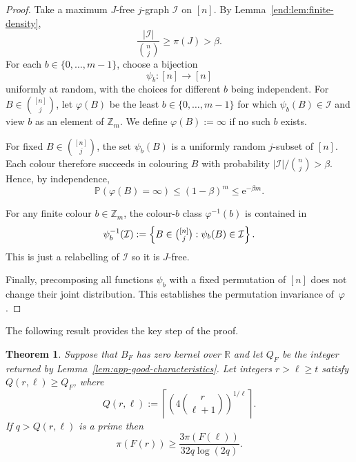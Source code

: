 \documentclass[10pt,a4paper]{article}
\numberwithin{equation}{section}
\newtheorem{theorem}{Theorem}[section]
\theoremstyle{definition}
\theoremstyle{remark}
\newcommand{\Z}[1]{\mathbb Z_{#1}}
\newcommand{\me}{\mathrm{e}}
\newcommand{\PP}{m}
\renewcommand{\longrightarrow}{\to}
\begin{document}
\begin{proof}
Take a maximum $J$-free $j$-graph $\mathcal I$ on $[n]$.  By Lemma~\ref{end:lem:finite-density},
\[
 \frac{|\mathcal I|}{\binom nj}\ge\pi(J)>\beta.
\]
For each $b\in\{0,\ldots,\PP-1\}$, choose a bijection
\[
 \psi_b:[n]\longrightarrow[n]
\]
 uniformly at random, with the choices for different $b$ being independent.
For $B\in\binom{[n]}j$, let $\varphi(B)$ be the least $b\in\{0,\ldots,\PP-1\}$ for which $\psi_b(B)\in\mathcal I$ and view $b$ as an element of $\Z{\PP}$. We define $\varphi(B):=\infty$ if no such $b$ exists.

For fixed $B\in\binom{[n]}{j}$, the set $\psi_b(B)$ is a uniformly random $j$-subset of $[n]$.  Each colour therefore succeeds in colouring $B$ with probability $|\mathcal I|/\binom nj>\beta$.  Hence, by independence,
\[
 \mathbb P(\varphi(B)=\infty)
 \le(1-\beta)^\PP\le \me^{-\beta \PP}.
\]

For any finite colour $b\in\Z{\PP}$, the colour-$b$ class $\varphi^{-1}(b)$ is contained in
\[
 \psi_b^{-1}(\mathcal I)
 :=\left\{B\in\tbinom{[n]}j:\psi_b(B)\in\mathcal I\right\}.
\]
 This is just a relabelling of $\mathcal I$ so it is $J$-free.

Finally, precomposing all functions $\psi_b$ with a fixed permutation of $[n]$ does not change their joint distribution.  This establishes the permutation invariance of~$\varphi$.
\end{proof}


The following result provides the key step of the proof.

\begin{theorem}\label{thm:app-lifting}
Suppose that $B_F$ has zero kernel over $\mathbb R$ and let $Q_F$ be the integer returned by Lemma~\ref{lem:app-good-characteristics}. 
Let integers $r>\ell\ge t$ satisfy $Q(r,\ell)\ge Q_F$, where 
\begin{equation}\label{eq:app-Q}
	Q(r,\ell):=
	\left\lceil
	\left(4\binom{r}{\ell+1}\right)^{1/\ell}
	\right\rceil.
\end{equation}
If $q>Q(r,\ell)$ is a prime then
\begin{equation}\label{eq:app-lifting}
 \pi(F(r))
 \ge
 \frac{3\pi(F(\ell))}{32q\log(2q)}.
\end{equation}
\end{theorem}
\end{document}
